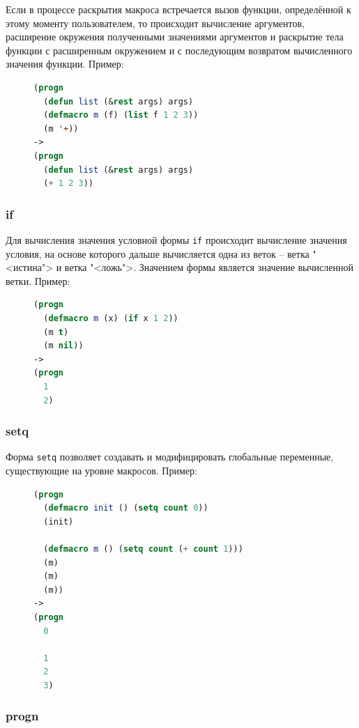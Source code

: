 Если в процессе раскрытия макроса встречается вызов функции, определённой к этому моменту пользователем, то происходит вычисление аргументов, расширение окружения полученными значениями аргументов и раскрытие тела функции с расширенным окружением и с последующим возвратом вычисленного значения функции. Пример:

\begin{figure}[H]
\begin{lstlisting}[language=Lisp]
(progn
  (defun list (&rest args) args)
  (defmacro m (f) (list f 1 2 3))
  (m '+))
->
(progn
  (defun list (&rest args) args)
  (+ 1 2 3))
\end{lstlisting}
\end{figure}

\subsubsection{if}

Для вычисления значения условной формы \texttt{if} происходит вычисление значения условия, на основе которого дальше вычисляется одна из веток -- ветка "<истина"> и ветка "<ложь">. Значением формы является значение вычисленной ветки. Пример:

\begin{figure}[H]
\begin{lstlisting}[language=Lisp]
(progn
  (defmacro m (x) (if x 1 2))
  (m t)
  (m nil))
->
(progn
  1
  2)
\end{lstlisting}
\end{figure}

\subsubsection{setq}

Форма \texttt{setq} позволяет создавать и модифицировать глобальные переменные, существующие на уровне макросов. Пример:

\begin{figure}[H]
\begin{lstlisting}[language=Lisp]
(progn
  (defmacro init () (setq count 0))
  (init)

  (defmacro m () (setq count (+ count 1)))
  (m)
  (m)
  (m))
->
(progn
  0

  1
  2
  3)
\end{lstlisting}
\end{figure}

\subsubsection{progn}

